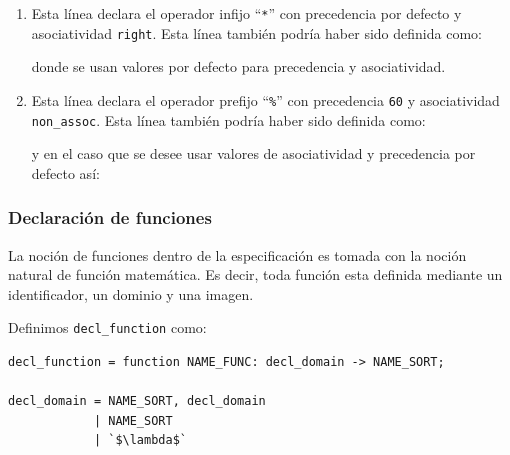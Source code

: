 \begin{enumerate}

\item 
\begin{center}
\end{center}
\vspace{0.2cm}
Esta línea declara el operador infijo ``\texttt{*}'' con precedencia por defecto y asociatividad \texttt{right}. Esta línea también podría haber sido definida como:
\vspace{0.2cm}
\begin{center}
\end{center}
\vspace{0.2cm}
donde se usan valores por defecto para precedencia y asociatividad.

\item 
\begin{center}
\end{center}
\vspace{0.2cm}
Esta línea declara el operador prefijo ``\texttt{\%}'' con precedencia \texttt{60} y asociatividad \texttt{non\_assoc}. Esta línea también podría haber sido definida como:
\vspace{0.2cm}

\begin{center}
\end{center}
\vspace{0.2cm}
y en el caso que se desee usar valores de asociatividad y precedencia por defecto así:
\vspace{0.2cm}

\begin{center}
\end{center}
\end{enumerate}
\subsubsection{Declaración de funciones}
La noción de funciones dentro de la especificación es tomada con la noción natural de función matemática. Es decir, toda función esta definida mediante un identificador, un dominio y una imagen.

Definimos \texttt{decl\_function} como:

\vspace{0.3cm}
\begin{lstlisting}[frame=shadowbox, rulesepcolor=\color{azul}, language=specmag]
decl_function = function NAME_FUNC: decl_domain -> NAME_SORT;

decl_domain = NAME_SORT, decl_domain
            | NAME_SORT
            | `$\lambda$`
\end{lstlisting}
\vspace{0.3cm}

